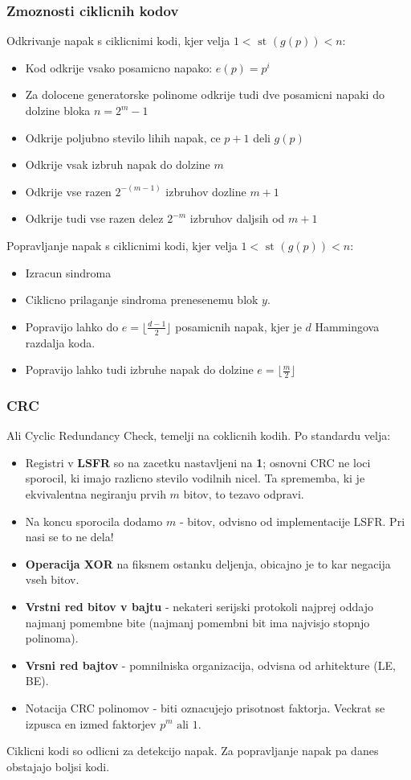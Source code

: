 \documentclass{article}
\begin{document}
\begin{multicols}{4}
\subsubsection{Zmoznosti ciklicnih kodov}
Odkrivanje napak s ciklicnimi kodi, kjer velja $1 < \text{ st }(g(p)) < n$:
\begin{itemize}
    \item Kod odkrije vsako posamicno napako: $e(p) = p^i$
    \item Za dolocene generatorske polinome odkrije tudi dve posamicni napaki do dolzine bloka $n = 2^m -1$
    \item Odkrije poljubno stevilo lihih napak, ce $p + 1$ deli $g(p)$
    \item Odkrije vsak izbruh napak do dolzine $m$
    \item Odkrije vse razen $2^{-(m-1)}$ izbruhov dozline $m + 1$
    \item Odkrije tudi vse razen delez $2^{-m}$ izbruhov daljsih od $m + 1$
\end{itemize}
Popravljanje napak s ciklicnimi kodi, kjer velja $1 < \text{ st }(g(p)) < n$:
\begin{itemize}
    \item Izracun sindroma
    \item Ciklicno prilaganje sindroma prenesenemu blok $y$.
    \item Popravijo lahko do $e = \lfloor \frac{d-1}{2} \rfloor$ posamicnih napak, kjer je
        $d$ Hammingova razdalja koda.
    \item Popravijo lahko tudi izbruhe napak do dolzine $e = \lfloor \frac{m}{2} \rfloor$
\end{itemize}

\subsubsection{CRC}
Ali Cyclic Redundancy Check, temelji na coklicnih kodih.
Po standardu velja:
\begin{itemize}
    \item Registri v \textbf{LSFR} so na zacetku nastavljeni na \textbf{1}; osnovni CRC ne loci sporocil,
        ki imajo razlicno stevilo vodilnih nicel. Ta sprememba, ki je ekvivalentna negiranju prvih $m$ bitov,
        to tezavo odpravi.
    \item Na koncu sporocila dodamo $m$ - bitov, odvisno od implementacije LSFR. Pri nasi se to ne dela!
    \item \textbf{Operacija XOR} na fiksnem ostanku deljenja, obicajno je to kar negacija vseh bitov.
    \item \textbf{Vrstni red bitov v bajtu} - nekateri serijski protokoli najprej oddajo najmanj pomembne bite
        (najmanj pomembni bit ima najvisjo stopnjo polinoma).
    \item \textbf{Vrsni red bajtov} - pomnilniska organizacija, odvisna od arhitekture (LE, BE).
    \item Notacija CRC polinomov - biti oznacujejo prisotnost faktorja. Veckrat se izpusca en izmed faktorjev $p^m \text{ ali } 1$.
\end{itemize}
Ciklicni kodi so odlicni za detekcijo napak. Za popravljanje napak pa danes obstajajo boljsi kodi.


\end{multicols}
\end{document}
